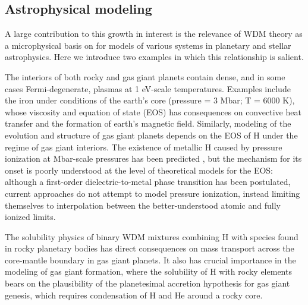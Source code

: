 \documentclass [11pt, proquest, article] {uwthesis}[2016/11/22]
\begin{document}
\subsection{Astrophysical modeling}
A large contribution to this growth in interest is the relevance of WDM theory as a microphysical basis on for models of various systems in planetary and stellar astrophysics. Here we introduce two examples in which this relationship is salient.

The interiors of both rocky and gas giant planets contain dense, and in some cases Fermi-degenerate, plasmas at 1 eV-scale temperatures. Examples include the iron under conditions of the earth's core (pressure = 3 Mbar; T = 6000 K), whose viscosity and equation of state (EOS) has consequences on convective heat transfer and the formation of earth's magnetic field. \cite{kuang1997earth} Similarly, modeling of the evolution and structure of gas giant planets depends on the EOS of H under the regime of gas giant interiors. The existence of metallic H caused by pressure ionization at Mbar-scale pressures has been predicted \cite{bonev2004quantum}, but the mechanism for its onset is poorly understood at the level of theoretical models for the EOS: although a first-order dielectric-to-metal phase transition has been postulated, current approaches do not attempt to model pressure ionization, instead limiting themselves to interpolation between the better-understood atomic and fully ionized limits. \cite{EBELING198580} %

The solubility physics of binary WDM mixtures combining H with species found in rocky planetary bodies has direct consequences on mass transport across the core-mantle boundary in gas giant planets. It also has crucial importance in the modeling of gas giant formation, where the solubility of H with rocky elements bears on the plausibility of the planetesimal accretion hypothesis for gas giant genesis, which requires condensation of H and He around a rocky core. \cite{wilson2012rocky} 
\end{document}
